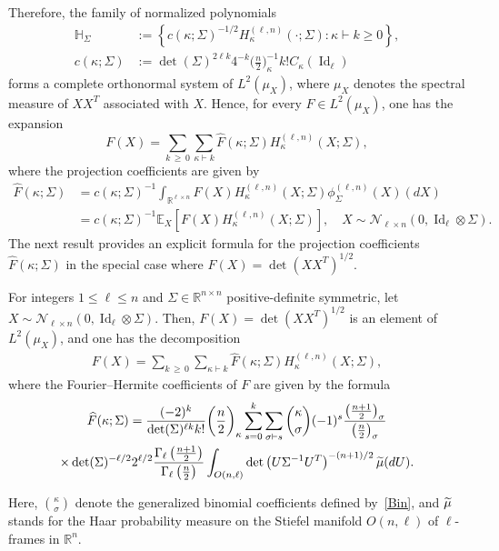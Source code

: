 \documentclass[AHL,Unicode,longabstracts,published]{cedram}
\DeclareMathOperator{\Id}{Id}
\newcommand{\scN}{\mathscr{N}}
\newcommand{\R}{\mathbb{R}}
\newcommand{\bbH}{\mathbb{H}}
\newcommand{\EX}[2]{\mathbb{E}_{#1}\left[#2\right]}
\let\oldtilde\tilde
\renewcommand*{\tilde}[1]{\mathchoice{\widetilde{#1}}{\widetilde{#1}}{\oldtilde{#1}}{\oldtilde{#1}}}
\begin{document}
Therefore, the family of normalized polynomials
\begin{equation}\label{cSigma}
\begin{split}
\bbH_{\Sigma} &{:=} \left\{ c(\kappa; \Sigma)^{-1/2} H_{\kappa}^{(\ell,n)}(\cdot;\Sigma): \kappa \vdash k \geq0\right\}, \\ c(\kappa;\Sigma) &{:=}\det(\Sigma)^{2\ell k}4^{-k}\bigg(\frac{n}{2}\bigg)_{\kappa}^{-1} k!C_{\kappa}(\Id_{\ell})
\end{split}
\end{equation}
forms a complete orthonormal system of $L^2(\mu_X)$, where $\mu_X$ denotes the spectral measure of $XX^T$ associated with $X$. Hence, for every $F \in L^2(\mu_X)$, one has the expansion
\[
F(X) = \sum_{k\,\geq\,0} \sum_{\kappa\vdash k} \widehat{F}(\kappa; \Sigma) H_{\kappa}^{(\ell,n)}(X; \Sigma),
\]
where the projection coefficients are given by
\begin{equation}\label{Fourier}
\begin{split}
\widehat{F}(\kappa; \Sigma) &= c(\kappa;\Sigma)^{-1}
\int_{\R^{\ell\times n}} F(X) H^{(\ell,n)}_{\kappa}(X;\Sigma) \phi_{\Sigma}^{(\ell,n)}(X) (dX) \\
&= c(\kappa;\Sigma)^{-1}
\EX{X}{F(X) H^{(\ell,n)}_{\kappa}(X;\Sigma)}, \quad X \sim \scN_{\ell \times n}(0, \Id_{\ell}\otimes \Sigma).
\end{split}
\end{equation}
The next result provides an explicit formula for the projection coefficients $\widehat{F}(\kappa; \Sigma)$ in the special case where $F(X) = \det(XX^T)^{1/2}$.

\begin{theo}\label{CoeffSigma}
For integers $1\leq \ell \leq n$ and $\Sigma \in \R^{n\times n}$ positive-definite symmetric, let $X \sim \scN_{\ell \times n}(0,\Id_{\ell}\otimes \Sigma)$. Then, $F(X)=\det(XX^T)^{1/2}$ is an element of $L^2(\mu_X)$, and one has the decomposition
\begin{gather*}
F(X)= \sum_{k\,\geq\,0} \sum_{\kappa\vdash k} \widehat{F}(\kappa;\Sigma) H_{\kappa}^{(\ell,n)}(X;\Sigma),
\end{gather*}
where the Fourier--Hermite coefficients of $F$ are given by the formula
\begin{multline}\label{For1}
\widehat{F}(\kappa; \Sigma) = \frac{ (-2)^{k} }{\det(\Sigma)^{\ell k} k!}\bigg(\frac{n}{2}\bigg)_{\kappa}
\sum_{s=0}^{k} \sum_{\sigma\vdash s} \binom{\kappa}{\sigma} (-1)^s\frac{\left(\frac{n+1}{2}\right)_{\sigma}}{\left(\frac{n}{2}\right)_{\sigma}} \\
\times
\det(\Sigma)^{-\ell/2} 2^{\ell/2} \frac{\Gamma_{\ell}\left(\frac{n+1}{2}\right)}{\Gamma_{\ell}\left(\frac{n}{2}\right)} \int_{O(n,\ell)} \det\left(U\Sigma^{-1}U^T\right)^{-(n+1)/2} \tilde{\mu}(dU).
\end{multline}
\end{theo}
Here, $\binom{\kappa}{\sigma}$ denote the generalized binomial coefficients defined by~\eqref{Bin}, and $\tilde{\mu}$ stands for the Haar probability measure on the Stiefel manifold $O(n,\ell)$ of $\ell$-frames in $\R^n$.
\end{document}
